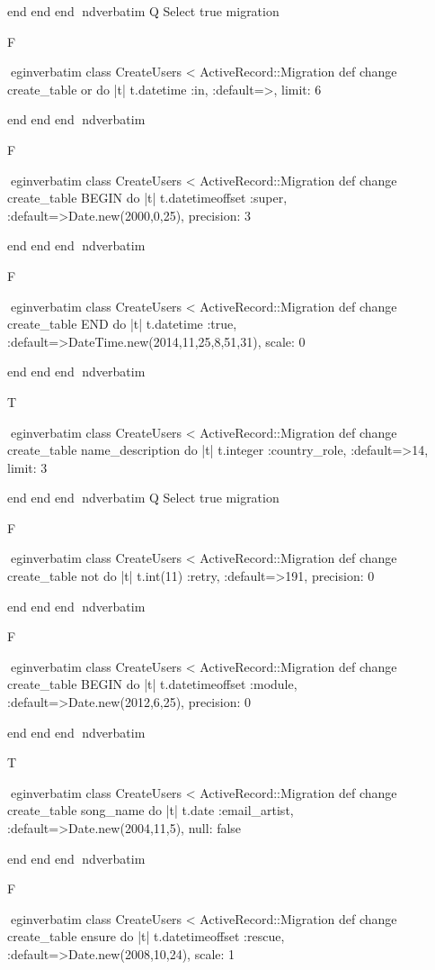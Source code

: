     end 
  end 
end
nd{verbatim}
Q
 Select true migration

F

egin{verbatim}
 class CreateUsers < ActiveRecord::Migration 
  def change 
    create_table or do |t| 
      t.datetime :in, :default=>, limit: 6
    
    end 
  end 
end
nd{verbatim}

F

egin{verbatim}
 class CreateUsers < ActiveRecord::Migration 
  def change 
    create_table BEGIN do |t| 
      t.datetimeoffset :super, :default=>Date.new(2000,0,25), precision: 3
    
    end 
  end 
end
nd{verbatim}

F

egin{verbatim}
 class CreateUsers < ActiveRecord::Migration 
  def change 
    create_table END do |t| 
      t.datetime :true, :default=>DateTime.new(2014,11,25,8,51,31), scale: 0
    
    end 
  end 
end
nd{verbatim}

T

egin{verbatim}
 class CreateUsers < ActiveRecord::Migration 
  def change 
    create_table name_description do |t| 
      t.integer :country_role, :default=>14, limit: 3
    
    end 
  end 
end
nd{verbatim}
Q
 Select true migration

F

egin{verbatim}
 class CreateUsers < ActiveRecord::Migration 
  def change 
    create_table not do |t| 
      t.int(11) :retry, :default=>191, precision: 0
    
    end 
  end 
end
nd{verbatim}

F

egin{verbatim}
 class CreateUsers < ActiveRecord::Migration 
  def change 
    create_table BEGIN do |t| 
      t.datetimeoffset :module, :default=>Date.new(2012,6,25), precision: 0
    
    end 
  end 
end
nd{verbatim}

T

egin{verbatim}
 class CreateUsers < ActiveRecord::Migration 
  def change 
    create_table song_name do |t| 
      t.date :email_artist, :default=>Date.new(2004,11,5), null: false
    
    end 
  end 
end
nd{verbatim}

F

egin{verbatim}
 class CreateUsers < ActiveRecord::Migration 
  def change 
    create_table ensure do |t| 
      t.datetimeoffset :rescue, :default=>Date.new(2008,10,24), scale: 1
    
